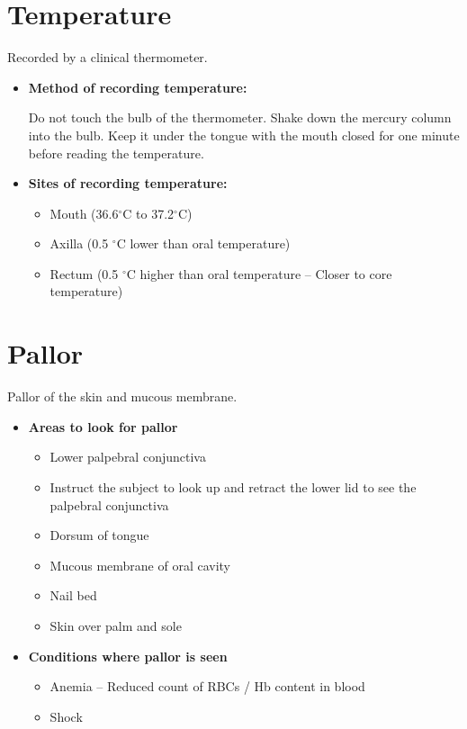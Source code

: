 \documentclass[a4paper,12pt,openany,twoside]{book}
\begin{document}
															\section*{Temperature}
															Recorded by a clinical thermometer.\newline
															\begin{itemize}
																	\itemsep0em
																\item{\textbf{Method of recording temperature:}}

																	Do not touch the bulb of the thermometer. Shake down the mercury column into the bulb. Keep it under the tongue with the mouth closed for one minute before reading the temperature.
																\item{\textbf{Sites of recording temperature:}}
																	\begin{itemize}%
																		\itemsep0em
																		\item{Mouth (36.6$^{\circ}$C to 37.2$^{\circ}$C)}
																		\item{Axilla (0.5 $^{\circ}$C lower than oral temperature)}
																		\item{Rectum (0.5 $^{\circ}$C higher than oral temperature – Closer to core temperature)}
																	\end{itemize}
															\end{itemize}

															\section*{Pallor}
															Pallor of the skin and mucous membrane.
															\begin{itemize}
																\item{\textbf{Areas to look for pallor}}
																	\begin{itemize}
																			\itemsep0em
																		\item{Lower palpebral conjunctiva}
																		\item{Instruct the subject to look up and retract the lower lid to see the palpebral conjunctiva}
																		\item{Dorsum of tongue}
																		\item{Mucous membrane of oral cavity}
																		\item{Nail bed}
																		\item{Skin over palm and sole}
																	\end{itemize}

																\item{\textbf{Conditions where pallor is seen}}
																	\begin{itemize}
																			\itemsep0em
																		\item{Anemia – Reduced count of RBCs / Hb content in blood}
																		\item{Shock}
																	\end{itemize}
															\end{itemize}
\end{document}
